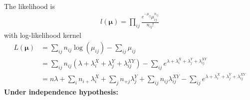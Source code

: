 \documentclass[11pt]{elegantbook}
\begin{document}
The likelihood is
\begin{equation}
    \begin{aligned}
        l(\boldsymbol{\mu})=\prod_{ij}\frac{e^{-\mu_{ij}}\mu_{ij}^{n_{ij}}}{n_{ij}!}
    \end{aligned}
    \nonumber
\end{equation}
with log-likelihood kernel
\begin{equation}
    \begin{aligned}
        L(\boldsymbol{\mu})&=\sum_{ij}n_{ij}\log(\mu_{ij})-\sum_{ij}\mu_{ij}\\
        &=\sum_{ij}n_{ij}\left(\lambda+\lambda_i^X+\lambda_j^Y+\lambda_{ij}^{XY}\right)-\sum_{ij}e^{\lambda+\lambda_i^X+\lambda_j^Y+\lambda_{ij}^{XY}}\\
        &=n\lambda + \sum_{i}n_{i+}\lambda_i^X+\sum_j n_{+j}\lambda_j^Y + \sum_{ij}n_{ij}\lambda_{ij}^{XY}-\sum_{ij}e^{\lambda+\lambda_i^X+\lambda_j^Y+\lambda_{ij}^{XY}}
    \end{aligned}
    \nonumber
\end{equation}
\textbf{Under independence hypothesis:}
\end{document}
